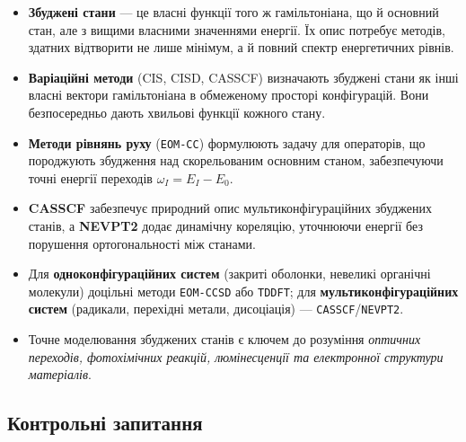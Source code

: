 
\begin{itemize}
    \item \textbf{Збуджені стани} --- це власні функції того ж гамільтоніана, що й основний стан,
          але з вищими власними значеннями енергії. Їх опис потребує методів,
          здатних відтворити не лише мінімум, а й повний спектр енергетичних рівнів.

    \item \textbf{Варіаційні методи} (CIS, CISD, CASSCF) визначають збуджені стани
          як інші власні вектори гамільтоніана в обмеженому просторі конфігурацій.
          Вони безпосередньо дають хвильові функції кожного стану.

    \item \textbf{Методи рівнянь руху} (\texttt{EOM-CC}) формулюють задачу для операторів,
          що породжують збудження над скорельованим основним станом,
          забезпечуючи точні енергії переходів $\omega_I = E_I - E_0$.

    \item \textbf{CASSCF} забезпечує природний опис мультиконфігураційних збуджених станів,
          а \textbf{NEVPT2} додає динамічну кореляцію, уточнюючи енергії без порушення ортогональності між станами.

    \item Для \textbf{одноконфігураційних систем} (закриті оболонки, невеликі органічні молекули)
          доцільні методи \texttt{EOM-CCSD} або \texttt{TDDFT};
          для \textbf{мультиконфігураційних систем} (радикали, перехідні метали, дисоціація)
          --- \texttt{CASSCF}/\texttt{NEVPT2}.

    \item Точне моделювання збуджених станів є ключем до розуміння
          \emph{оптичних переходів, фотохімічних реакцій, люмінесценції та електронної структури матеріалів}.
\end{itemize}



\subsection*{Контрольні запитання}


